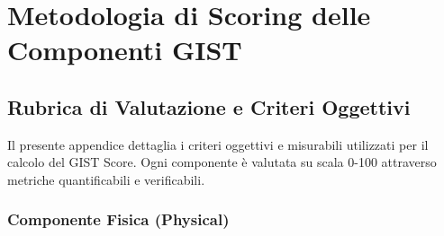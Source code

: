 
\chapter{Metodologia di Scoring delle Componenti GIST}
\label{app:scoring}

\section{Rubrica di Valutazione e Criteri Oggettivi}

Il presente appendice dettaglia i criteri oggettivi e misurabili utilizzati per il calcolo del GIST Score. Ogni componente è valutata su scala 0-100 attraverso metriche quantificabili e verificabili.

\subsection{Componente Fisica (Physical)}

